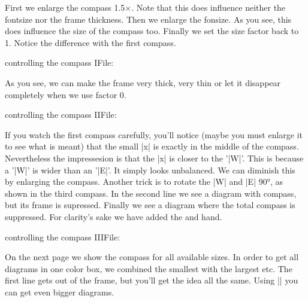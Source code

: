 \documentclass[onedown-examples]{subfiles}
\makeatletter
\def\CP{\ODw@Compass}
\makeatother
\begin{document}
First we enlarge the compass 1.5$\times$. Note that this does influence
neither the fontsize nor the frame thickness. Then we enlarge the fonsize.
As you see, this does influence the size of the compass too. Finally
we set the size factor back to 1. Notice the difference with the first
compass.
\vfill
\begin{HBox}{controlling the compass I\hfill File: \FileName}
\makeatletter
  \def\CP{\ODw@Compass}
\makeatother
\CP
{}\CP
{}\CP
{}\CP
\end{HBox}
\vfill
As you see, we can make the frame very thick, very thin or let it
disappear completely when we use factor 0. 
\vfill
\begin{HBox}{controlling the compass II\hfill File: \FileName}
\makeatletter
  \def\CP{\ODw@Compass}
\makeatother
{}\CP
{}\CP
{}\CP
{}\CP
\end{HBox}
\vfill
If you watch the first compass carefully, you'll notice (maybe you must
enlarge it to see what is meant) that the small |x| is exactly in the
middle of the compass. Nevertheless the impressesion is that the |x| is
closer to the '|W|'. This is because a '|W|' is wider than an '|E|'.
It simply looks unbalanced. We can diminish this by enlarging the compass.
Another trick is to rotate the |W| and |E| 90°, as shown in the third
compass. In the second line we see a diagram with compass, but its
frame is supressed. Finally we see a diagram where the total compass is
suppressed. For clarity's sake we have added the \east and \west hand.
\vfill
\begin{HBox}{controlling the compass III\hfill File: \FileName}
\makeatletter
  \def\CP{\ODw@Compass}
\makeatother
{}
\CP
{}\CP
{}\CP
{}
\gamefont{\footnotesize}
\showEW\hfill
{}
\showEW
\end{HBox}
\vfill
On the next page we show the compass for all available sizes. In order to
get all diagrams in one color box, we combined the smallest with the
largest etc. The first line gets out of the frame, but you'll get the idea
all the same. Using |\scalefont| you can get even bigger diagrams.
\vfill
\end{document}
